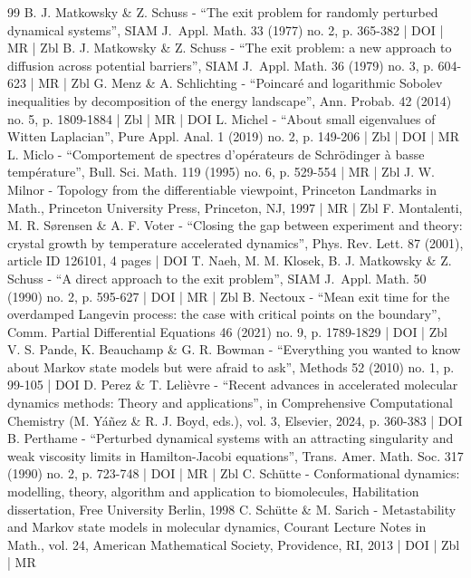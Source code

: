 \documentclass[10pt]{amsart}
\theoremstyle{plain}
\theoremstyle{definition}
\begin{document}
\begin{thebibliography}{99}
B. J. Matkowsky \& Z. Schuss - “The exit problem for randomly perturbed dynamical systems”, SIAM J. Appl. Math. 33 (1977) no. 2, p. 365-382 | DOI | MR | Zbl
B. J. Matkowsky \& Z. Schuss - “The exit problem: a new approach to diffusion across potential barriers”, SIAM J. Appl. Math. 36 (1979) no. 3, p. 604-623 | MR | Zbl
G. Menz \& A. Schlichting - “Poincaré and logarithmic Sobolev inequalities by decomposition of the energy landscape”, Ann. Probab. 42 (2014) no. 5, p. 1809-1884 | Zbl | MR | DOI
L. Michel - “About small eigenvalues of Witten Laplacian”, Pure Appl. Anal. 1 (2019) no. 2, p. 149-206 | Zbl | DOI | MR
L. Miclo - “Comportement de spectres d’opérateurs de Schrödinger à basse température”, Bull. Sci. Math. 119 (1995) no. 6, p. 529-554 | MR | Zbl
J. W. Milnor - Topology from the differentiable viewpoint, Princeton Landmarks in Math., Princeton University Press, Princeton, NJ, 1997 | MR | Zbl
F. Montalenti, M. R. Sørensen \& A. F. Voter - “Closing the gap between experiment and theory: crystal growth by temperature accelerated dynamics”, Phys. Rev. Lett. 87 (2001), article ID 126101, 4 pages | DOI
T. Naeh, M. M. Klosek, B. J. Matkowsky \& Z. Schuss - “A direct approach to the exit problem”, SIAM J. Appl. Math. 50 (1990) no. 2, p. 595-627 | DOI | MR | Zbl
B. Nectoux - “Mean exit time for the overdamped Langevin process: the case with critical points on the boundary”, Comm. Partial Differential Equations 46 (2021) no. 9, p. 1789-1829 | DOI | Zbl
V. S. Pande, K. Beauchamp \& G. R. Bowman - “Everything you wanted to know about Markov state models but were afraid to ask”, Methods 52 (2010) no. 1, p. 99-105 | DOI
D. Perez \& T. Lelièvre - “Recent advances in accelerated molecular dynamics methods: Theory and applications”, in Comprehensive Computational Chemistry (M. Yáñez \& R. J. Boyd, eds.), vol. 3, Elsevier, 2024, p. 360-383 | DOI
B. Perthame - “Perturbed dynamical systems with an attracting singularity and weak viscosity limits in Hamilton-Jacobi equations”, Trans. Amer. Math. Soc. 317 (1990) no. 2, p. 723-748 | DOI | MR | Zbl
C. Schütte - Conformational dynamics: modelling, theory, algorithm and application to biomolecules, Habilitation dissertation, Free University Berlin, 1998
C. Schütte \& M. Sarich - Metastability and Markov state models in molecular dynamics, Courant Lecture Notes in Math., vol. 24, American Mathematical Society, Providence, RI, 2013 | DOI | Zbl | MR

\end{thebibliography}
\end{document}
